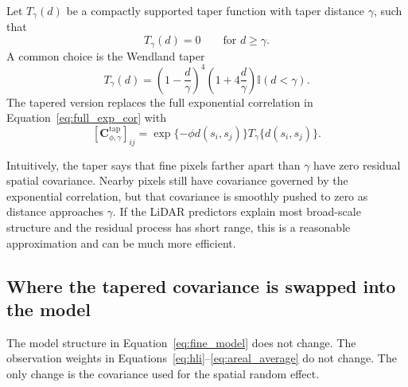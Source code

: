\documentclass[11pt]{article}
\begin{document}
Let $T_{\gamma}(d)$ be a compactly supported taper function with taper distance $\gamma$, such that
\begin{equation}
T_{\gamma}(d)=0
\qquad \text{for } d\ge \gamma.
\label{eq:taper_zero}
\end{equation}
A common choice is the Wendland taper
\begin{equation}
T_{\gamma}(d)
=
\left(1-\frac{d}{\gamma}\right)^4
\left(1+4\frac{d}{\gamma}\right)
\mathbb{I}(d<\gamma).
\label{eq:wendland}
\end{equation}
The tapered version replaces the full exponential correlation in Equation~\eqref{eq:full_exp_cor} with
\begin{equation}
\left[\bm{C}^{\mathrm{tap}}_{\phi,\gamma}\right]_{ij}
=
\exp\{-\phi d(s_i,s_j)\}
T_{\gamma}\{d(s_i,s_j)\}.
\label{eq:tapered_cor}
\end{equation}

Intuitively, the taper says that fine pixels farther apart than $\gamma$ have zero residual spatial covariance. Nearby pixels still have covariance governed by the exponential correlation, but that covariance is smoothly pushed to zero as distance approaches $\gamma$. If the LiDAR predictors explain most broad-scale structure and the residual process has short range, this is a reasonable approximation and can be much more efficient.

\subsection{Where the tapered covariance is swapped into the model}

The model structure in Equation~\eqref{eq:fine_model} does not change. The observation weights in Equations~\eqref{eq:hli}--\eqref{eq:areal_average} do not change. The only change is the covariance used for the spatial random effect.
\end{document}
